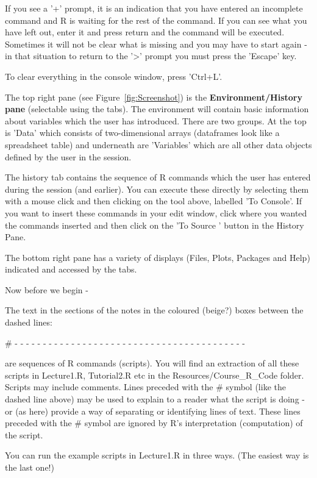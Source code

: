 \documentclass[titlepage]{book}\usepackage{knitr}
\begin{document}
If you see a '+' prompt, it is an indication that you have entered an incomplete command and R is waiting for the rest of the command. If you can see what you have left out, enter it and press return and the command will be executed.  Sometimes it will not be clear what is missing and you may have to start again -  in that situation to return to the '>' prompt you must press the 'Escape' key.  

To clear everything in the console window, press 'Ctrl+L'.

The top right pane (see Figure~\ref{fig:Screenshot}) is the \textbf{Environment/History pane} (selectable using the tabs). The environment will contain basic information about variables which the user has introduced. There are two groups. At the top is 'Data' which consists of two-dimensional arrays (dataframes look like a spreadsheet table) and underneath are 'Variables' which are all other data objects defined by the user in the session.

The history tab contains the sequence of R commands which the user has entered during the session (and earlier). You can execute these directly by selecting them with a mouse click and then clicking on the tool above, labelled 'To Console'. If you want to insert these commands in your edit window, click where you wanted the commands inserted and then click on the 'To Source ' button in the History Pane.


The bottom right pane has a variety of displays (Files, Plots, Packages and Help) indicated and accessed by the tabs.

Now before we begin -

The text in the sections of the notes in the coloured (beige?) boxes between the dashed lines:

\# - - - - - - - - - - - - - - - - - - - - - - - - - - - - - - - - - - - - - - - - -

are sequences of R commands (scripts). You will find an extraction of all these scripts in Lecture1.R, Tutorial2.R etc in the Resources/Course\_R\_Code folder.
Scripts may include comments. Lines preceded with the \# symbol (like the dashed line above) may be used to explain to a reader what the script is doing - or (as here) provide a way of separating or identifying lines of text. These lines preceded with the \# symbol are ignored by R's interpretation (computation) of the script.

You can run the example scripts in Lecture1.R in three ways.
(The easiest way is the last one!)
\end{document}
